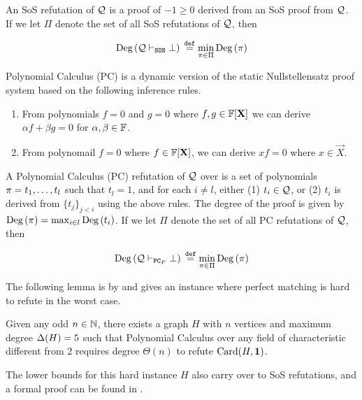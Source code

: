 \documentclass[11pt]{article}
\begin{document}
\begin{definition}
An SoS refutation of $\mathcal{Q}$ is a proof of $-1 \geq 0$ derived from an SoS proof from $\mathcal{Q}$. If we let $\Pi$ denote the set of all SoS refutations of $\mathcal{Q}$, then  

\[ \text{Deg}\left(\mathcal{Q} \vdash_{\texttt{SOS}} \bot\right) \text{}\overset{\mathtt{def}}{=} \min_{\pi \in \Pi}\text{Deg}\left(\pi\right)\]
	
\end{definition}

Polynomial Calculus (PC) is a dynamic version of the static Nullstellensatz proof system \citep[Section 1.3]{fleming2019semialgebraic} based on the following inference rules.
\begin{enumerate}
	\item From polynomials $f=0$ and $g=0$ where $f,g \in \mathbb{F}[\mathbf{X}]$ we can derive $\alpha f + \beta g = 0$ for $\alpha, \beta \in \mathbb{F}$.
	\item From polynomail $f=0$ where $f \in \mathbb{F}[\mathbf{X}]$, we can derive $xf=0$ where $x \in \vec{X}$.
\end{enumerate}

\begin{definition}\label{def:poly-calc-refutations}
A Polynomial Calculus (PC) refutation of $\mathcal{Q}$ over is a set of polynomials $\pi = t_1, \dots, t_l$	such that $t_l = 1$, and for each $i \neq l$, either (1) $t_i \in \mathcal{Q}$, or (2) $t_i$ is derived from $\{t_j\}_{j < i}$ using the above rules. 
The degree of the proof is given by $\text{Deg}\left(\pi\right) = \max_{i \in l}\text{Deg}\left(t_i\right)$. If we let $\Pi$ denote the set of all PC refutations of $\mathcal{Q}$, then  

\[ \text{Deg}\left(\mathcal{Q} \vdash_{\texttt{PC}_F} \bot\right) \text{}\overset{\mathtt{def}}{=} \min_{\pi \in \Pi}\text{Deg}\left(\pi\right)\]
\end{definition}

The following lemma is by \citet{buss1999linear} and gives an instance where perfect matching is hard to refute in the worst case.
\begin{lemma}\label{lemma:worst-case-instance}Given any odd $n \in \mathbb{N}$, there exists a graph $H$ with $n$ vertices and maximum degree $\Delta(H)= 5$ such that Polynomial Calculus over any field of characteristic different from 2 requires degree $\Theta(n)$ to refute $\text{Card}(H, \mathbf{1})$.
\end{lemma}

The lower bounds for this hard instance $H$ also carry over to SoS refutations, and a formal proof can be found in \citep[Theorem A.3]{Austrin_2022}.
\end{document}
